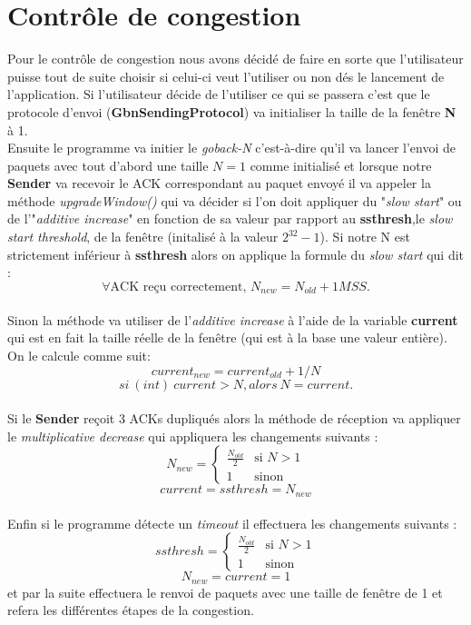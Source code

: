 \documentclass[11pt]{article}
\begin{document}
\section{Contrôle de congestion}
Pour le contrôle de congestion nous avons décidé de faire en sorte que l'utilisateur puisse tout de suite choisir si celui-ci veut l'utiliser ou non dés le lancement de l'application. Si l'utilisateur décide de l'utiliser ce qui se passera c'est que le protocole d'envoi (\textbf{GbnSendingProtocol}) va initialiser la taille de la fenêtre \textbf{N} à 1. \\ 
Ensuite le programme va initier le \textit{goback-N} c'est-à-dire qu'il va lancer l'envoi de paquets avec tout d'abord une taille $N=1$ comme initialisé et lorsque notre \textbf{Sender} va recevoir le ACK correspondant au paquet envoyé il va appeler la méthode \textit{upgradeWindow()} qui va décider si l'on doit appliquer du "\textit{slow start}" ou de l'"\textit{additive increase}" en fonction de sa valeur par rapport au \textbf{ssthresh},le \textit{slow start threshold}, de la fenêtre (initalisé à la valeur $2^{32}-1$). Si notre N est strictement inférieur à \textbf{ssthresh} alors on applique la formule du \textit{slow start} qui dit : \[
\forall \text{ACK reçu correctement, }N_{new} = N_{old}+1 MSS.
\]\\
Sinon la méthode va utiliser de l'\textit{additive increase} à l'aide de la variable \textbf{current} qui est en fait la taille réelle de la fenêtre (qui est à la base une valeur entière). On le calcule comme suit:
\[
current_{new} = current_{old}+1/N 
\]
\[
si \ (int)\ current > N, alors \ N = current.
\]
\\
Si le \textbf{Sender} reçoit 3 ACKs dupliqués alors la méthode de réception va appliquer le \textit{multiplicative decrease} qui appliquera les changements suivants : 
\[
N_{new} = \begin{cases}
\frac{N_{old}}{2} & \text{si } N > 1 \\
1 & \text{sinon}
\end{cases}
\] 
\[
current = ssthresh = N_{new} 
\]\\
Enfin si le programme détecte un \textit{timeout} il effectuera les changements suivants :
\[
ssthresh = \begin{cases}
\frac{N_{old}}{2} & \text{si } N>1 \\
1 & \text{sinon}
\end{cases}
\]
\[
N_{new}=current = 1
\]
et par la suite effectuera le renvoi de paquets avec une taille de fenêtre de 1 et refera les différentes étapes de la congestion.\\
\end{document}
